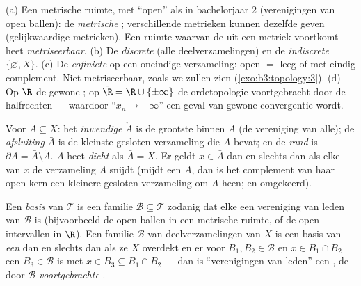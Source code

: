 \begin{example}\label{ex:b3:topology:examples}
(a) Een metrische ruimte, met ``open'' als in bachelorjaar 2
(verenigingen van open ballen): de \emph{metrische };
verschillende metrieken kunnen dezelfde  geven
(gelijkwaardige metrieken). Een ruimte waarvan de  uit
een metriek voortkomt heet \emph{metriseerbaar}.
(b) De \emph{discrete}  (alle deelverzamelingen) en de
\emph{indiscrete}  $\{\varnothing, X\}$.
(c) De \emph{cofiniete}  op een oneindige verzameling:
open $=$ leeg of met eindig complement. Niet metriseerbaar, zoals
we zullen zien (\cref{exo:b3:topology:3}).
(d) Op $\R$ de gewone ; op $\bar\R = \R \cup
\{\pm\infty\}$ de ordetopologie voortgebracht door de
halfrechten --- waardoor ``$x_n \to +\infty$'' een geval van
gewone convergentie wordt.
\end{example}

\begin{definition}\label{def:b3:topology:interior}
Voor $A \subseteq X$: het \emph{inwendige} $\mathring A$ is de
grootste  binnen $A$ (de vereniging van alle);
de \emph{afsluiting} $\bar A$ is de kleinste
gesloten verzameling die $A$ bevat; en de \emph{rand} is
$\partial A = \bar A \setminus \mathring A$. $A$ heet
\emph{dicht} als $\bar A = X$. Er
geldt $x \in \bar A$ dan en slechts dan als elke  van $x$
de verzameling $A$ snijdt (mijdt een  $A$, dan is het
complement van haar open kern een kleinere gesloten verzameling om
$A$ heen; en omgekeerd).
\end{definition}

\begin{definition}\label{def:b3:topology:basis}
Een \emph{basis} van $\mathcal T$
is een familie $\mathcal B \subseteq \mathcal T$ zodanig dat elke
 een vereniging van leden van $\mathcal B$ is
(bijvoorbeeld de open ballen in een metrische ruimte, of de open
intervallen in $\R$). Een familie $\mathcal B$ van
deelverzamelingen van $X$ is een basis van \emph{een} 
dan en slechts dan als ze $X$ overdekt en er voor $B_1, B_2 \in
\mathcal B$ en $x \in B_1 \cap B_2$ een $B_3 \in \mathcal B$ is
met $x \in B_3 \subseteq B_1\cap B_2$ --- dan is ``verenigingen
van leden'' een , de door $\mathcal B$
\emph{voortgebrachte} .
\end{definition}

